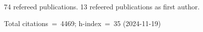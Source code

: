 74 refereed publications. 13 refeered publications as first author.

Total citations~=~4469; h-index~=~35 (2024-11-19)